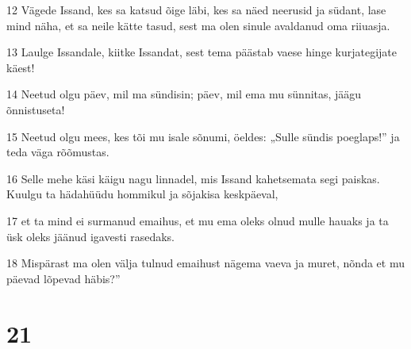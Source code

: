 \par 12 Vägede Issand, kes sa katsud õige läbi, kes sa näed neerusid ja südant, lase mind näha, et sa neile kätte tasud, sest ma olen sinule avaldanud oma riiuasja.
\par 13 Laulge Issandale, kiitke Issandat, sest tema päästab vaese hinge kurjategijate käest!
\par 14 Neetud olgu päev, mil ma sündisin; päev, mil ema mu sünnitas, jäägu õnnistuseta!
\par 15 Neetud olgu mees, kes tõi mu isale sõnumi, öeldes: „Sulle sündis poeglaps!” ja teda väga rõõmustas.
\par 16 Selle mehe käsi käigu nagu linnadel, mis Issand kahetsemata segi paiskas. Kuulgu ta hädahüüdu hommikul ja sõjakisa keskpäeval,
\par 17 et ta mind ei surmanud emaihus, et mu ema oleks olnud mulle hauaks ja ta üsk oleks jäänud igavesti rasedaks.
\par 18 Mispärast ma olen välja tulnud emaihust nägema vaeva ja muret, nõnda et mu päevad lõpevad häbis?”

\chapter{21}

